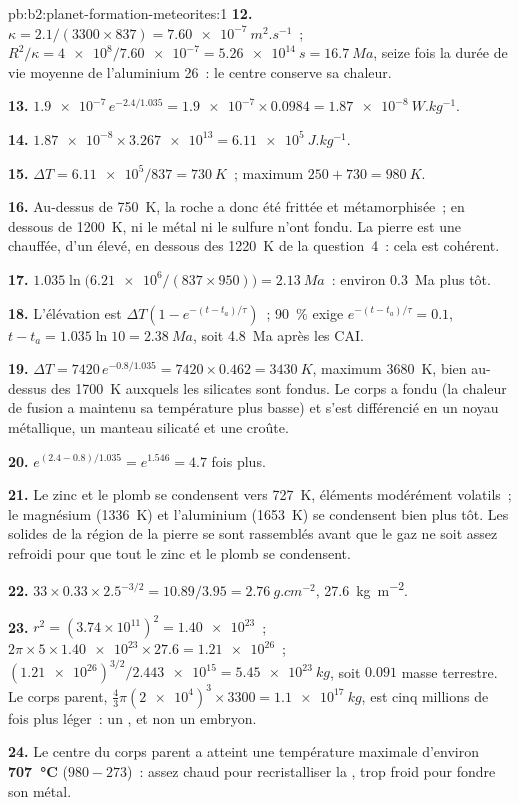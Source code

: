 \begin{solution}{pb:b2:planet-formation-meteorites:1}
\textbf{12.} $\kappa = 2.1/(3300\times837) = \qty{7.60e-7}{m^2.s^{-1}}$~;
$R^2/\kappa = \num{4e8}/\num{7.60e-7} = \qty{5.26e14}{s} = \qty{16.7}{Ma}$, seize fois la durée de vie moyenne de
l'aluminium 26~: le centre conserve sa chaleur.

\textbf{13.} $\num{1.9e-7}\,e^{-2.4/1.035} = \num{1.9e-7}\times0.0984 =
\qty{1.87e-8}{W.kg^{-1}}$.

\textbf{14.} $\num{1.87e-8}\times\num{3.267e13} = \qty{6.11e5}{J.kg^{-1}}$.

\textbf{15.} $\Delta T = \num{6.11e5}/837 = \qty{730}{K}$~; maximum
$250 + 730 = \qty{980}{K}$.

\textbf{16.} Au-dessus de \qty{750}{K}, la roche a donc été frittée et métamorphisée~; en dessous de \qty{1200}{K}, ni le
métal ni le sulfure n'ont fondu. La pierre est une  chauffée, d'un  élevé, en dessous des
\qty{1220}{K} de la question~4~: cela est cohérent.

\textbf{17.} $1.035\ln\bigl(\num{6.21e6}/(837\times950)\bigr) = \qty{2.13}{Ma}$~: environ
\qty{0.3}{Ma} plus tôt.

\textbf{18.} L'élévation est $\Delta T(1 - e^{-(t - t_a)/\tau})$~; \qty{90}{\percent}
exige $e^{-(t - t_a)/\tau} = 0.1$, $t - t_a = 1.035\ln10 = \qty{2.38}{Ma}$, soit
\qty{4.8}{Ma} après les CAI.

\textbf{19.} $\Delta T = 7420\,e^{-0.8/1.035} = 7420\times0.462 = \qty{3430}{K}$, maximum
\qty{3680}{K}, bien au-dessus des \qty{1700}{K} auxquels les silicates sont fondus. Le corps a
fondu (la chaleur de fusion a maintenu sa température plus basse) et s'est différencié en un noyau
métallique, un manteau silicaté et une croûte.

\textbf{20.} $e^{(2.4 - 0.8)/1.035} = e^{1.546} = 4.7$ fois plus.

\textbf{21.} Le zinc et le plomb se condensent vers \qty{727}{K}, éléments modérément volatils~; le
magnésium (\qty{1336}{K}) et l'aluminium (\qty{1653}{K}) se condensent bien plus tôt. Les solides
de la région de la pierre se sont rassemblés avant que le gaz ne soit assez refroidi pour que tout
le zinc et le plomb se condensent.

\textbf{22.} $33\times0.33\times2.5^{-3/2} = 10.89/3.95 = \qty{2.76}{g.cm^{-2}}$,
\qty{27.6}{kg.m^{-2}}.

\textbf{23.} $r^2 = (3.74\times10^{11})^2 = \num{1.40e23}$~;
$2\pi\times5\times\num{1.40e23}\times27.6 = \num{1.21e26}$~;
$(\num{1.21e26})^{3/2}/\num{2.443e15} = \qty{5.45e23}{kg}$, soit $0.091$ masse terrestre. Le corps
parent, $\tfrac43\pi(\num{2e4})^3\times3300 = \qty{1.1e17}{kg}$, est cinq millions de fois plus
léger~: un , et non un embryon.

\textbf{24.} Le centre du corps parent a atteint une température maximale d'environ
\textbf{\qty[text-series-to-math=true]{707}{\degreeCelsius}} ($980 - 273$)~: assez chaud pour recristalliser la
, trop froid pour fondre son métal.
\end{solution}
